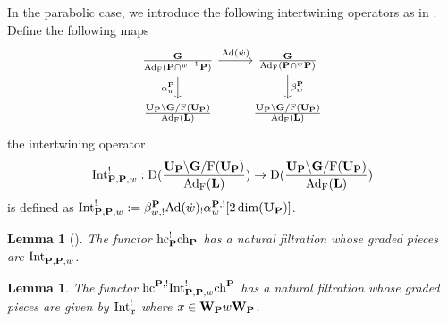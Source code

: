 \documentclass[article, 10pt, oneside, reqno]{amsart}
\theoremstyle{plain}
\newtheorem{lem}[thm]{Lemma}
\theoremstyle{definition}
\theoremstyle{remark}
\begin{document}
In the parabolic case, we introduce the following intertwining operators as in \cite[Section 4.3]{EteveJordan}. Define the following maps 
\[\begin{tikzcd}
	{\frac{\Gbf}{\Ad_{\Frob}(\Pbf \cap {^{w^{-1}}}\Pbf)}} & {\frac{\Gbf}{\Ad_{\Frob}(\Pbf \cap {^{w}}\Pbf)}} \\
	{\frac{\UP \backslash \Gbf/\Frob(\UP)}{\Ad_{\Frob}(\Lbf)}} & {\frac{\UP \backslash \Gbf/\Frob(\UP)}{\Ad_{\Frob}(\Lbf)}}
	\arrow["{\Ad(\dot{w})}", from=1-1, to=1-2]
	\arrow["{\alpha_w^{\Pbf}}"', from=1-1, to=2-1]
	\arrow["{\beta_w^{\Pbf}}", from=1-2, to=2-2]
\end{tikzcd}\]
the intertwining operator
$$\mathrm{Int}_{\mathbf{P}, \mathbf{P},w}^! : \mathrm{D}(\frac{\mathbf{U}_{\mathbf{P}} \backslash \mathbf{G}/\mathrm{F}(\mathbf{U}_{\mathbf{P}})}{\mathrm{Ad}_{\mathrm{F}}(\mathbf{L})}) \to \mathrm{D}(\frac{\mathbf{U}_{\mathbf{P}} \backslash \mathbf{G}/\mathrm{F}(\mathbf{U}_{\mathbf{P}})}{\mathrm{Ad}_{\mathrm{F}}(\mathbf{L})})$$
is defined as $\mathrm{Int}_{\mathbf{P}, \mathbf{P},w}^! := \beta_{w,!}^{\mathbf{P}}\mathrm{Ad}(\dot{w})_!\alpha_{w}^{\mathbf{P}, !}[2\dim(\mathbf{U}_{\mathbf{P}})]$.

\begin{lem}[]\label{lem:mackay-filtration-parabolic-case}
The functor $\mathrm{hc}^!_{\mathbf{P}}\mathrm{ch}_{\mathbf{P}}$ has a natural filtration whose graded pieces are $\mathrm{Int}_{\mathbf{P}, \mathbf{P}, w}^!$.
\end{lem}

\begin{lem}\label{lem:comparison-mackay}
The functor $\mathrm{hc}^{\mathbf{P},!}\mathrm{Int}_{\mathbf{P}, \mathbf{P},w}^!\mathrm{ch}^{\mathbf{P}}$ has a natural filtration whose graded pieces are given by $\mathrm{Int}_x^!$ where $x \in \mathbf{W}_{\mathbf{P}}w\mathbf{W}_{\mathbf{P}}$. 
\end{lem}
\end{document}
